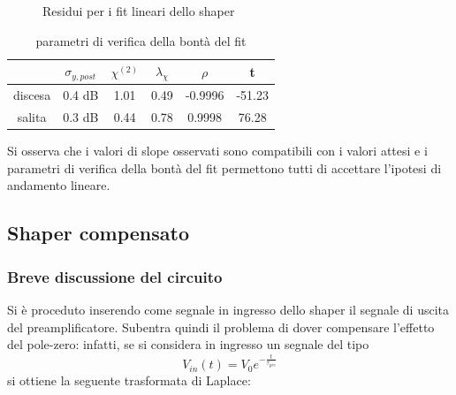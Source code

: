 \documentclass{article}
\begin{document}
\begin{figure}
    \centering
    \caption{Residui per i fit lineari dello shaper}
    \label{fig:residuishapersladis}
\end{figure}

\begin{table}[H]
    \centering
    \begin{tabular}{cccccc}
        \toprule
                &$\sigma_{y, post}$    &$\chi^{(2)}$    &$\lambda_{\chi}$   &$\rho$ &t      \\
        \midrule
        discesa &0.4 dB                &1.01            &0.49               &-0.9996&-51.23\\
        salita  &0.3 dB                &0.44            &0.78               &0.9998 &76.28  \\
        \bottomrule
    \end{tabular}
    \caption{parametri di verifica della bontà del fit}
\end{table}

Si osserva che i valori di slope osservati sono compatibili con i valori attesi e i parametri di verifica
della bontà del fit permettono tutti di accettare l'ipotesi di andamento lineare.

\subsection{Shaper compensato}

\subsubsection{Breve discussione del circuito}

Si è proceduto inserendo come segnale in ingresso dello shaper il segnale di uscita del preamplificatore. Subentra quindi il problema 
di dover compensare l'effetto del pole-zero: infatti, se si considera in ingresso un segnale del tipo 
\[V_{in}(t)=V_0 e^{-\frac{t}{\tau_{pre}}}\] 
si ottiene la seguente trasformata di Laplace:
\end{document}
